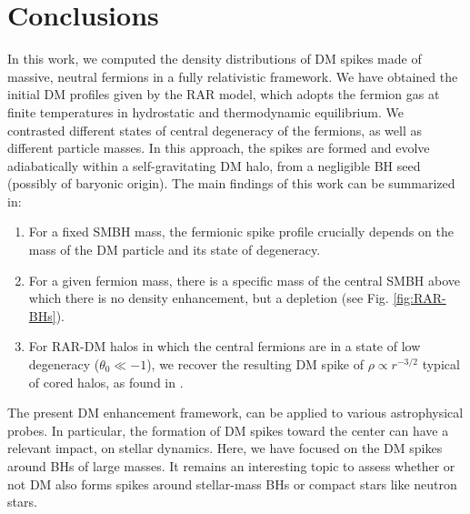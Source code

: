 \documentclass[baaa]{baaa}
\begin{document}

\section{Conclusions}\label{sec:conclusions}

In this work, we computed the density distributions of DM spikes made of massive, neutral fermions in a fully relativistic framework. We have obtained the initial DM profiles given by the RAR model, which adopts the fermion gas at finite temperatures in hydrostatic and thermodynamic equilibrium. 
We contrasted different states of central degeneracy of the fermions, as well as different particle masses.  
In this approach, the spikes are formed and evolve adiabatically within a self-gravitating DM halo, from a negligible BH seed (possibly of baryonic origin).
The main findings of this work can be summarized in:
\begin{enumerate}
    \item For a fixed SMBH mass, the fermionic spike profile crucially depends on the mass of the DM particle and its state of degeneracy.
    \item For a given fermion mass, there is a specific mass of the central SMBH above which there is no density enhancement, but a depletion (see Fig. \ref{fig:RAR-BHs}).
    \item For RAR-DM halos in which the central fermions are in a state of low degeneracy ($\theta_0 \ll -1$), we recover the resulting DM spike of $\rho \propto r^{-3/2}$ typical of cored halos, as found in \cite{gondolo1999dark}.
\end{enumerate}

The present DM enhancement framework, can be applied to various astrophysical probes. In particular, the formation of DM spikes toward the center can have a relevant impact, on stellar dynamics. Here, we have focused on the DM spikes around BHs of large masses. It remains an interesting topic to assess whether or not DM also forms spikes around stellar-mass BHs or compact stars like neutron stars. 

\end{document}
